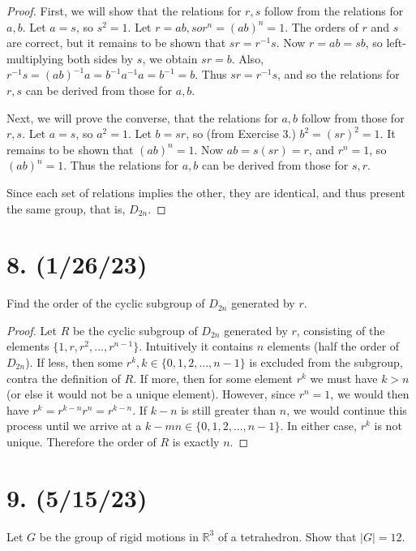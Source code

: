 \documentclass{article}
\begin{document}
\begin{proof}
    First, we will show that the relations for $r, s$ follow from the relations for $a, b$. Let $a = s$, so $s^2 = 1$. Let $r = ab, so r^n = (ab)^n = 1$. The orders of $r$ and $s$ are correct, but it remains to be shown that $sr = r^{-1}s$. Now $r = ab = sb$, so left-multiplying both sides by $s$, we obtain $sr = b$. Also, $r^{-1}s = (ab)^{-1} a = b^{-1} a^{-1} a = b^{-1} = b$. Thus $sr = r^{-1}s$, and so the relations for $r, s$ can be derived from those for $a, b$.
    
    Next, we will prove the converse, that the relations for $a, b$ follow from those for $r, s$. Let $a = s$, so $a^2 = 1$. Let $b = sr$, so (from Exercise 3.) $b^2 = (sr)^2 = 1$. It remains to be shown that $(ab)^n = 1$. Now $ab = s(sr) = r$, and $r^n = 1$, so $(ab)^n = 1$. Thus the relations for $a, b$ can be derived from those for $s, r$.

    Since each set of relations implies the other, they are identical, and thus present the same group, that is, $D_{2n}$.
\end{proof}

\section*{8. (1/26/23)}

Find the order of the cyclic subgroup of $D_{2n}$ generated by $r$.

\begin{proof}
    Let $R$ be the cyclic subgroup of $D_{2n}$ generated by $r$, consisting of the elements $\{1, r, r^2, ..., r^{n - 1}\}$. Intuitively it contains $n$ elements (half the order of $D_{2n}$). If less, then some $r^k, k \in \{0, 1, 2, ..., n - 1\}$ is excluded from the subgroup, contra the definition of $R$. If more, then for some element $r^k$ we must have $k > n$ (or else it would not be a unique element). However, since $r^n = 1$, we would then have $r^k = r^{k - n} r^n = r^{k - n}$. If $k - n$ is still greater than $n$, we would continue this process until we arrive at a $k - mn \in \{0, 1, 2, ..., n - 1\}$. In either case, $r^k$ is not unique. Therefore the order of $R$ is exactly $n$.
\end{proof}

\section*{9. (5/15/23)}

Let $G$ be the group of rigid motions in $\mathbb{R}^3$ of a tetrahedron. Show that $|G| = 12$.
\end{document}
